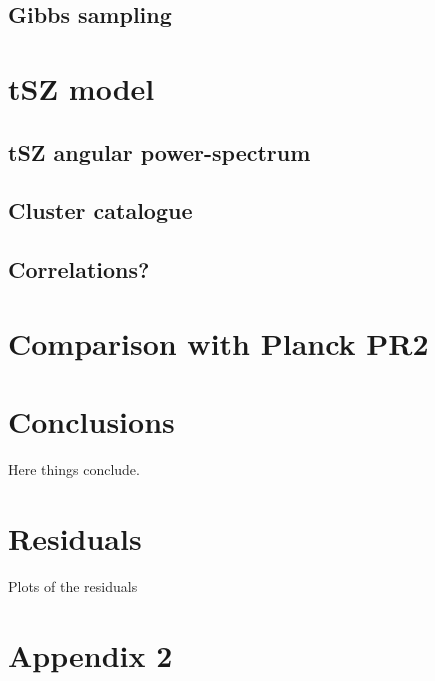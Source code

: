 \documentclass{aa}
\begin{document}
\subsection{Gibbs sampling}
\label{sec:gibbs}


\section{tSZ model}
\label{sec:tsz}

\subsection{tSZ angular power-spectrum}
\label{sec:ps}

\subsection{Cluster catalogue}
\label{sec:catalogue}

\subsection{Correlations?}
\label{sec:corr}

\section{Comparison with Planck PR2}
\label{sec:planckpr2}

\section{Conclusions}
\label{sec:conclusions}
Here things conclude.





\clearpage
\appendix
\onecolumn
\section{Residuals}
\label{app:residuals}
Plots of the residuals

\section{Appendix 2}
\label{app:}
\end{document}
